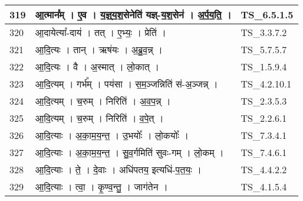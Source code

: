 \documentclass[17pt]{extarticle}
\begin{document}
\begin{longtable}{||p{0.4in}||p{4.9in}||p{0.9in}||}
    \hline
        
    319 & आ॒त्मान᳚म्   ।   ए॒व   ।   य॒ज्ञ्॒य॒श॒सेनेति॑ यज्ञ्{-}य॒श॒सेन॑   ।   अ॒र्प॒य॒ति॒   ।    & TS\_6.5.1.5       \\
    
    \hline
        
    320 & आ॒दायेत्या᳚{-}दाय॑   ।   तत्   ।   ए॒भ्यः॒   ।   प्रेति॑   ।    & TS\_3.3.7.2       \\
    
    \hline
        
    321 & आ॒दि॒त्यः   ।   तान्   ।   ऋष॑यः   ।   अ॒ब्रु॒व॒न्न्   ।    & TS\_5.7.5.7       \\
    
    \hline
        
    322 & आ॒दि॒त्यः   ।   वै   ।   अ॒स्मात्   ।   लो॒कात्   ।    & TS\_1.5.9.4       \\
    
    \hline
        
    323 & आ॒दि॒त्यम्   ।   गर्भ᳚म्   ।   पय॑सा   ।   स॒म॒ञ्जन्निति॑ सं{-}अ॒ञ्जन्न्   ।    & TS\_4.2.10.1       \\
    
    \hline
        
    324 & आ॒दि॒त्यम्   ।   च॒रुम्   ।   निरिति॑   ।   अ॒व॒प॒न्न्   ।    & TS\_2.3.5.3       \\
    
    \hline
        
    325 & आ॒दि॒त्यम्   ।   च॒रुम्   ।   निरिति॑   ।   व॒पे॒त्   ।    & TS\_2.2.6.1       \\
    
    \hline
        
    326 & आ॒दि॒त्याः   ।   अ॒का॒म॒य॒न्त॒   ।   उ॒भयोः᳚   ।   लो॒कयोः᳚   ।    & TS\_7.3.4.1       \\
    
    \hline
        
    327 & आ॒दि॒त्याः   ।   अ॒का॒म॒य॒न्त॒   ।   सु॒व॒र्गमिति॑ सुवः{-}गम्   ।   लो॒कम्   ।    & TS\_7.4.6.1       \\
    
    \hline
        
    328 & आ॒दि॒त्याः   ।   ते॒   ।   दे॒वाः   ।   अधि॑पतय॒ इत्यधि॑{-}प॒त॒यः॒   ।    & TS\_4.4.2.2       \\
    
    \hline
        
    329 & आ॒दि॒त्याः   ।   त्वा॒   ।   कृ॒ण्व॒न्तु॒   ।   जाग॑तेन   ।    & TS\_4.1.5.4       \\
    

\end{longtable}
\end{document}
